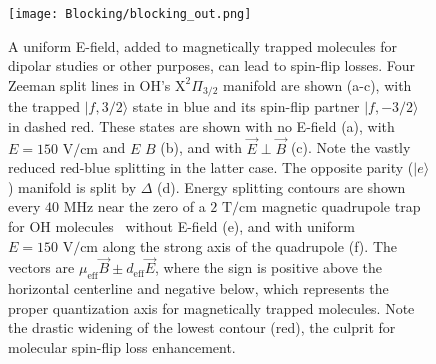 \documentclass[%
 reprint,
 amsmath,amssymb,
 aps,
prl,
]{revtex4-1}
\newcommand{\red}[1]{{\color{black} #1}}
\newcommand{\epb}{{$\vec{E}\!\perp\!\vec{B}$}}
\begin{document}

\begin{figure}[tb]
\texttt{[image: Blocking/blocking\_out.png]}%
\caption{
A uniform E-field, added to magnetically trapped molecules for dipolar studies or other purposes, can lead to spin-flip losses. Four Zeeman split lines in OH's $\mathrm{X}^2\Pi_{3/2}$ manifold are shown (a-c), with the trapped $|f,3/2\rangle$ state in blue and its spin-flip partner $|f,-3/2\rangle$ in dashed red. These states are shown with no E-field (a), with $E=150\text{ V/cm}$ and $E\,$\raisebox{0.5px}{$\parallel$}$\,B$
(b), and with \epb{} (c). Note the vastly reduced red-blue splitting in the latter case. The opposite parity ($|e\rangle$) manifold is split by $\Delta$ (d). Energy splitting contours are shown every $40\text{ MHz}$ near the zero of a $2\text{ T/cm}$ magnetic quadrupole trap for OH molecules~\cite{Stuhl2012uwave} without E-field (e), and with uniform $E=150\text{ V/cm}$ along the strong axis of the quadrupole (f). \red{The vectors are $\mu_\text{eff}\vec{B}\pm d_\text{eff}\vec{E}$, where the sign is positive above the horizontal centerline and negative below, which  represents the proper quantization axis for magnetically trapped molecules.} Note the drastic widening of the lowest contour (red), the culprit for molecular spin-flip loss enhancement.}
\label{fig:blocking}
\end{figure}
\end{document}
